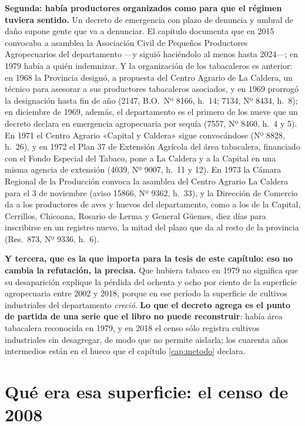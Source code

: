 \textbf{Segunda: había productores organizados como para que el régimen tuviera sentido.} Un
decreto de emergencia con plazo de denuncia y umbral de daño supone gente que va a denunciar.
El capítulo documenta que en 2015 convocaba a asamblea la Asociación Civil de Pequeños
Productores Agropecuarios del departamento ---y siguió haciéndolo al menos hasta 2024---; en 1979 había a quién indemnizar. Y la organización de los tabacaleros es anterior: en 1968 la Provincia designó, a propuesta del Centro Agrario de La Caldera, un técnico para asesorar a sus productores tabacaleros asociados, y en 1969 prorrogó la designación hasta fin de año (2147, B.O.\ Nº 8166, h.\ 14; 7134, Nº 8434, h.\ 8); en diciembre de 1969, además, el departamento es el primero de los nueve que un decreto declara en emergencia agropecuaria por sequía (7557, Nº 8460, h.\ 4 y 5). En 1971 el Centro Agrario «Capital y Caldera» sigue convocándose (Nº 8828, h.\ 26), y en 1972 el Plan 37 de Extensión Agrícola del área tabacalera, financiado con el Fondo Especial del Tabaco, pone a La Caldera y a la Capital en una misma agencia de extensión (4039, Nº 9007, h.\ 11 y 12). En 1973 la Cámara Regional de la Producción convoca la asamblea del Centro Agrario La Caldera para el 3 de noviembre (aviso 15866, Nº 9362, h.\ 33), y la Dirección de Comercio da a los productores de aves y huevos del departamento, como a los de la Capital, Cerrillos, Chicoana, Rosario de Lerma y General Güemes, diez días para inscribirse en un registro nuevo, la mitad del plazo que da al resto de la provincia (Res.\ 873, Nº 9336, h.\ 6).

\textbf{Y tercera, que es la que importa para la tesis de este capítulo: eso no cambia la
refutación, la precisa.} Que hubiera tabaco en 1979 no significa que su desaparición explique
la pérdida del ochenta y ocho por ciento de la superficie agropecuaria entre 2002 y 2018,
porque en ese período la superficie de cultivos industriales del departamento \textit{creció}.
\textbf{Lo que el decreto agrega es el punto de partida de una serie que el libro no puede
reconstruir}: había área tabacalera reconocida en 1979, y en 2018 el censo sólo registra
cultivos industriales sin desagregar, de modo que no permite aislarla; los cuarenta
años intermedios están en el hueco que el capítulo \ref{cap:metodo} declara.

\section{Qué era esa superficie: el censo de 2008}

